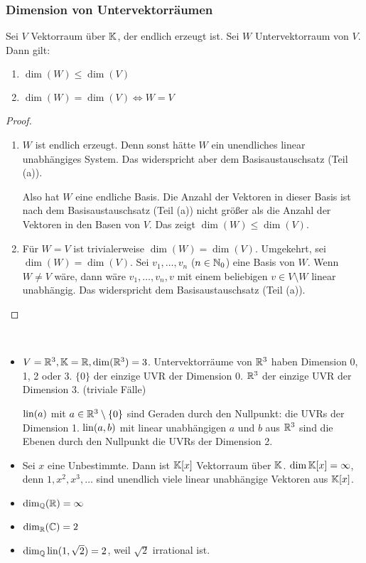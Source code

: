 \subsubsection{Dimension von Untervektorräumen}

\begin{klr}
	Sei $ V $ Vektorraum über $ \mathbb K $, der endlich erzeugt ist. Sei $ W $ Untervektorraum von $ V $. Dann gilt:
	\begin{enumerate}
		\item $ \dim(W) \leq \dim(V) $
		\item $ \dim(W) = \dim(V) \Leftrightarrow W = V $
	\end{enumerate}
\end{klr}

\begin{proof}
\begin{enumerate}
	\item
	$ W $ ist endlich erzeugt. Denn sonst hätte $ W $ ein unendliches linear unabhängiges System. Das widerspricht aber dem Basisaustauschsatz (Teil (a)).
	
	Also hat $ W $ eine endliche Basis. Die Anzahl der Vektoren in dieser Basis ist nach dem Basisaustauschsatz (Teil (a)) nicht größer als die Anzahl der Vektoren in den Basen von $ V $. Das zeigt $ \dim(W) \leq \dim(V) $.
	
	\item
	Für $ W = V $ ist trivialerweise $ \dim(W) = \dim(V) $. Umgekehrt, sei $ \dim(W) = \dim(V) $. Sei $ v_1, \ldots, v_n $ ($ n \in \mathbb N_0 $) eine Basis von $ W $. Wenn $ W \neq V $ wäre, dann wäre $ v_1, \ldots, v_n, v $ mit einem beliebigen $ v \in V \setminus W $ linear unabhängig. Das widerspricht dem Basisaustauschsatz (Teil (a)). \qedhere
\end{enumerate}
\end{proof}

\begin{bsp}\
\begin{itemize}
	\item $ V = \mathbb R^3, \mathbb K = \mathbb R, \dim(\mathbb R^3) = 3 $. Untervektorräume von $ \mathbb R^3 $ haben Dimension 0, 1, 2 oder 3. $ \{ 0 \} $ der einzige UVR der Dimension 0. $ \mathbb R^3 $ der einzige UVR der Dimension 3. (triviale Fälle)
		
	$ \operatorname{lin}(a) $ mit $ a \in \mathbb R^3 \setminus \{ 0 \} $ sind Geraden durch den Nullpunkt: die UVRs der Dimension 1. $ \operatorname{lin}(a,b) $ mit linear unabhängigen $ a $ und $ b $ aus $ \mathbb R^3 $ sind die Ebenen durch den Nullpunkt die UVRs der Dimension 2.
	\item Sei $ x $ eine Unbestimmte. Dann ist $ \mathbb K[x] $ Vektorraum über $ \mathbb K $. $ \dim\mathbb K[x] = \infty $, denn $ 1, x^2, x^3, \ldots $ sind unendlich viele linear unabhängige Vektoren aus $ \mathbb K[x] $.
	\item $ \dim_\mathbb Q(\mathbb R) = \infty $
	\item $\dim_\mathbb R(\mathbb C) = 2$
	\item $\dim_\mathbb Q \operatorname{lin}(1,\sqrt{2}) = 2$, weil $\sqrt{2}$ irrational ist. 
\end{itemize}
\end{bsp}

